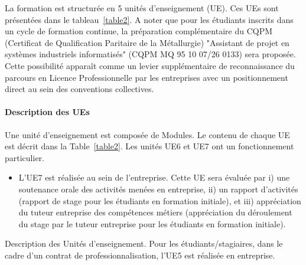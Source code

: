 \documentclass[11pt]{article}
\begin{document}
\begin{multicols}{2}
La formation est structurée en 5 unités d'enseignement (UE). Ces UEs sont présentées dans le tableau~\ref{table2}. A noter que pour les étudiants inscrits dans un cycle de formation continue, la préparation complémentaire du CQPM (Certificat de Qualification Paritaire de la Métallurgie) "Assistant de projet en systèmes industriels informatisés" (CQPM MQ 95 10 07/26 0133) sera proposée. Cette possibilité apparaît comme un levier supplémentaire de reconnaissance du parcours en Licence Professionnelle par les entreprises avec un positionnement direct au sein des conventions collectives.


\newpage

\paragraph{Description des UEs}


Une unité d'enseignement est composée de Modules. Le contenu de chaque UE est décrit dans la Table~\ref{table2}. Les unités UE6 et UE7 ont un fonctionnement particulier.
\begin{itemize}
\item L'UE7 est réalisée au sein de l'entreprise. Cette UE sera évaluée par i) une soutenance orale des activités menées en entreprise,
ii) un rapport d'activités (rapport de stage pour les étudiants en formation initiale), et iii) appréciation du tuteur entreprise des compétences métiers (appréciation du déroulement du stage par le tuteur entreprise pour les étudiants en formation initiale).
\end{itemize}

\end{multicols}

\begin{table}[!h]
\centering
%
\caption{Description des Unités d'enseignement. Pour les étudiants/stagiaires, dans le cadre d'un contrat de professionnalisation, l'UE5 est réalisée en entreprise.}
\label{table2}
\end{table}


\newpage


\end{document}
